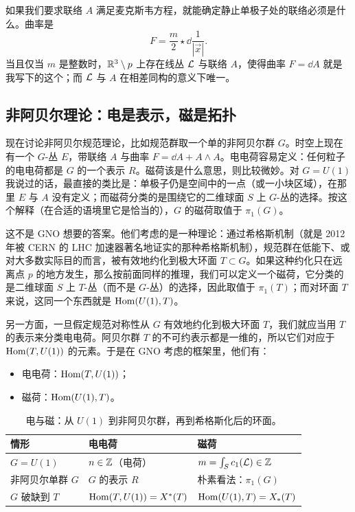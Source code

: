 如果我们要求联络 $A$ 满足麦克斯韦方程，就能确定静止单极子处的联络必须是什么。曲率是
\begin{equation}
  F=\frac{m}{2}\star \dd\frac{1}{|\vec x|}.
  \label{eq:monopole}
\end{equation}
当且仅当 $m$ 是整数时，$\mathbb{R}^3\setminus p$ 上存在线丛 $\mathcal{L}$ 与联络 $A$，使得曲率 $F=\dd A$ 就是我写下的这个；而 $\mathcal{L}$ 与 $A$ 在相差同构的意义下唯一。

\subsection{非阿贝尔理论：电是表示，磁是拓扑}

现在讨论非阿贝尔规范理论，比如规范群取一个单的非阿贝尔群 $G$。时空上现在有一个 $G$-丛 $E$，带联络 $A$ 与曲率 $F=\dd A+A\wedge A$。电电荷容易定义：任何粒子的电电荷都是 $G$ 的一个表示 $R$。磁荷该是什么意思，则比较微妙。对 $G=U(1)$ 我说过的话，最直接的类比是：单极子仍是空间中的一点（或一小块区域），在那里 $E$ 与 $A$ 没有定义；而磁荷分类的是围绕它的二维球面 $S$ 上 $G$-丛的选择。按这个解释（在合适的语境里它是恰当的），$G$ 的磁荷取值于 $\pi_1(G)$。

这不是 GNO 想要的答案。他们考虑的是一种理论：通过希格斯机制（就是 2012 年被 CERN 的 LHC 加速器著名地证实的那种希格斯机制），规范群在低能下、或对大多数实际目的而言，被有效地约化到极大环面 $T\subset G$。如果这种约化只在远离点 $p$ 的地方发生，那么按前面同样的推理，我们可以定义一个磁荷，它分类的是二维球面 $S$ 上 $T$-丛（而不是 $G$-丛）的选择，因此取值于 $\pi_1(T)$；而对环面 $T$ 来说，这同一个东西就是 $\operatorname{Hom}(U(1),T)$。

另一方面，一旦假定规范对称性从 $G$ 有效地约化到极大环面 $T$，我们就应当用 $T$ 的表示来分类电电荷。阿贝尔群 $T$ 的不可约表示都是一维的，所以它们对应于 $\operatorname{Hom}(T,U(1))$ 的元素。于是在 GNO 考虑的框架里，他们有：
\begin{itemize}
  \item 电电荷：$\operatorname{Hom}(T,U(1))$；
  \item 磁荷：$\operatorname{Hom}(U(1),T)$。
\end{itemize}

\begin{table}[htbp]
\centering\small
\caption{电与磁：从 $U(1)$ 到非阿贝尔群，再到希格斯化后的环面。}
\label{tab:electric-magnetic}
\begin{tabular}{@{}lll@{}}
\toprule
情形 & 电电荷 & 磁荷 \\
\midrule
$G=U(1)$ & $n\in\mathbb{Z}$（电荷） & $m=\int_S c_1(\mathcal{L})\in\mathbb{Z}$ \\
非阿贝尔单群 $G$ & $G$ 的表示 $R$ & 朴素看法：$\pi_1(G)$ \\
$G$ 破缺到 $T$ & $\operatorname{Hom}(T,U(1))=X^*(T)$ & $\operatorname{Hom}(U(1),T)=X_*(T)$ \\
\bottomrule
\end{tabular}
\end{table}


